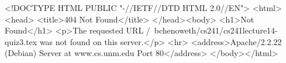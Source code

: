 <!DOCTYPE HTML PUBLIC "-//IETF//DTD HTML 2.0//EN">
<html><head>
<title>404 Not Found</title>
</head><body>
<h1>Not Found</h1>
<p>The requested URL /~bchenoweth/cs241/cs241lecture14-quiz3.tex was not found on this server.</p>
<hr>
<address>Apache/2.2.22 (Debian) Server at www.cs.unm.edu Port 80</address>
</body></html>
